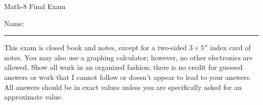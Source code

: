 \documentclass[letterpaper,12pt,fleqn]{article}
\begin{document}
\begin{center}
\Large Math-8 Final Exam
\end{center}

\vspace{0.5in}

Name: \rule{4in}{1pt}

\vspace{0.5in}

This exam is closed book and notes, except for a two-sided $3\times 5''$ index card of
notes. You may also use a graphing calculator; however, no other electronics are allowed.
Show all work in an organized fashion; there is no credit for guessed answers or work
that I cannot follow or doesn't appear to lead to your answers. All answers should be in
exact values unless you are specifically asked for an approximate value.

\vspace{0.5in}
\end{document}
